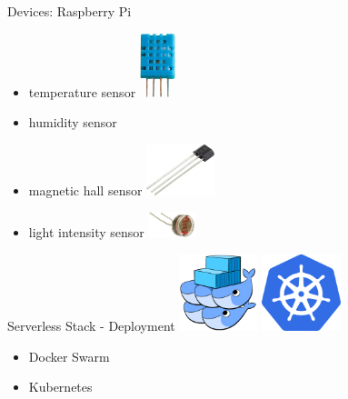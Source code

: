 \documentclass[aspectratio=1610]{beamer}
\begin{document}
  \begin{frame}{Devices: Raspberry Pi}
    \begin{itemize}
      \item temperature sensor
            \hspace*{2em}
            \includegraphics[align=c,height=5em]{dht11-sensor}
      \item humidity sensor
      \item magnetic hall sensor
            \hspace*{2em}
            \includegraphics[align=c,height=4em]{hall-sensor}
      \item light intensity sensor
            \hspace*{2em}
            \includegraphics[align=c,height=2em]{light-sensor}
    \end{itemize}
  \end{frame}

  \begin{frame}{Serverless Stack - Deployment}
    \includegraphics[align=c,height=6em]{docker-swarm-logo}
    \hspace*{2em}
    \includegraphics[align=c,height=6em]{kubernetes-logo}

    \vspace*{2em}

    \begin{itemize}
      \item Docker Swarm
      \item Kubernetes
    \end{itemize}
  \end{frame}
\end{document}
